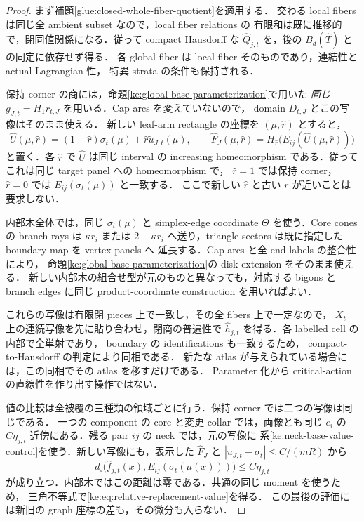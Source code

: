 \begin{proof}
まず補題\ref{glue:closed-whole-fiber-quotient}を適用する．
交わる local fibers は同じ全 ambient subset なので，local fiber relations の
有限和は既に推移的で，閉同値関係になる．従って compact Hausdorff な
$\widehat Q_{j,t}$ を，後の $B_d(\widehat T)$ との同定に依存せず得る．
各 global fiber は local fiber そのものであり，連結性と actual Lagrangian 性，
特異 strata の条件も保持される．

保持 corner の商には，命題\ref{ke:global-base-parameterization}で用いた
\emph{同じ} $g_{J,t}=H_1r_{t,J}$ を用いる．Cap arcs を変えていないので，
domain $D_{t,J}$ とこの写像はそのまま使える．
新しい leaf-arm rectangle の座標を $(\mu,\widehat r)$ とすると，
\[
 \widehat U(\mu,\widehat r)
 =(1-\widehat r)\sigma_t(\mu)+\widehat r\widetilde u_{J,t}(\mu),
 \qquad
 \widehat F_J(\mu,\widehat r)
 =H_{\widehat r}\bigl(E_{ij}(\widehat U(\mu,\widehat r))\bigr)
\]
と置く．各 $\widehat r$ で $\widehat U$ は同じ interval の increasing
homeomorphism である．従ってこれは同じ target panel への homeomorphism で，
$\widehat r=1$ では保持 corner，$\widehat r=0$ では
$E_{ij}(\sigma_t(\mu))$ と一致する．
ここで新しい $\widehat r$ と古い $r$ が近いことは要求しない．

内部木全体では，同じ $\sigma_t(\mu)$ と simplex-edge coordinate $\Theta$
を使う．Core cones の branch rays は $\kappa r_i$ または $2-\kappa r_i$
へ送り，triangle sectors は既に指定した boundary map を vertex panels へ
延長する．Cap arcs と全 end labels の整合性により，
命題\ref{ke:global-base-parameterization}の disk extension をそのまま使える．
新しい内部木の組合せ型が元のものと異なっても，対応する bigons と branch
edges に同じ product-coordinate construction を用いればよい．

これらの写像は有限閉 pieces 上で一致し，その全 fibers 上で一定なので，
$X_t$ 上の連続写像を先に貼り合わせ，閉商の普遍性で
$\widehat h_{j,t}$ を得る．各 labelled cell の内部で全単射であり，
boundary の identifications も一致するため，
compact-to-Hausdorff の判定により同相である．
新たな atlas が与えられている場合には，この同相でその atlas を移すだけである．
Parameter 化から critical-action の直線性を作り出す操作ではない．

値の比較は全被覆の三種類の領域ごとに行う．保持 corner では二つの写像は同じである．
一つの component の core と変更 collar では，両像とも同じ $e_i$ の
$C\eta_{j,t}$ 近傍にある．残る pair $ij$ の neck では，元の写像に
系\ref{ke:neck-base-value-control}を使う．新しい写像にも，表示した
$\widehat F_J$ と $|\widetilde u_{J,t}-\sigma_t|\le C/(mR)$ から
\[
 d_\square\bigl(\widehat f_{j,t}(x),
                    E_{ij}(\sigma_t(\mu(x)))\bigr)\le C\eta_{j,t}
\]
が成り立つ．内部木ではこの距離は零である．共通の同じ moment を使うため，
三角不等式で\eqref{ke:eq:relative-replacement-value}を得る．
この最後の評価には新旧の graph 座標の差も，その微分も入らない．
\end{proof}

